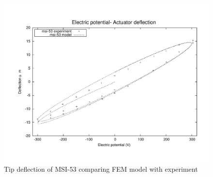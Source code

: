 \begin{figure}
\centering
\includegraphics[width=5.0in]{./chap_3_minor_loop/figures/result_msi-53.pdf}
\caption{Tip deflection of MSI-53 comparing FEM model with experiment}
\label{fig:MSI_53_XP_results}
\end{figure}

